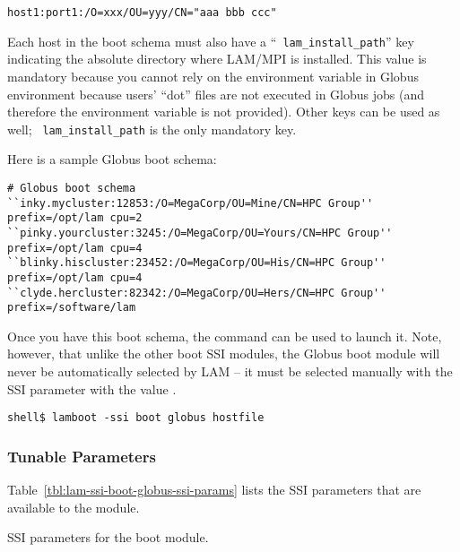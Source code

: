 \centerline{\tt host1:port1:/O=xxx/OU=yyy/CN="aaa bbb ccc"}
  
Each host in the boot schema must also have a ``{\tt
  lam\_\-install\_\-path}'' key indicating the absolute directory
where LAM/MPI is installed.  This value is mandatory because you
cannot rely on the  environment variable in Globus
environment because users' ``dot'' files are not executed in Globus
jobs (and therefore the  environment variable is not
provided).  Other keys can be used as well; {\tt
  lam\_\-install\_\-path} is the only mandatory key.

Here is a sample Globus boot schema:

\lstset{style=lam-shell}
\begin{lstlisting}
# Globus boot schema
``inky.mycluster:12853:/O=MegaCorp/OU=Mine/CN=HPC Group'' prefix=/opt/lam cpu=2
``pinky.yourcluster:3245:/O=MegaCorp/OU=Yours/CN=HPC Group'' prefix=/opt/lam cpu=4
``blinky.hiscluster:23452:/O=MegaCorp/OU=His/CN=HPC Group'' prefix=/opt/lam cpu=4
``clyde.hercluster:82342:/O=MegaCorp/OU=Hers/CN=HPC Group'' prefix=/software/lam
\end{lstlisting}

Once you have this boot schema, the  command can be used
to launch it.  Note, however, that unlike the other boot SSI modules,
the Globus boot module will never be automatically selected by LAM --
it must be selected manually with the  SSI parameter
with the value .

\lstset{style=lam-cmdline}
\begin{lstlisting}
shell$ lamboot -ssi boot globus hostfile
\end{lstlisting}


\subsubsection{Tunable Parameters}

Table~\ref{tbl:lam-ssi-boot-globus-ssi-params} lists the SSI
parameters that are available to the  module.

\begin{table}[htbp]
  \begin{ssiparamtb}
%
  \end{ssiparamtb}
  \caption{SSI parameters for the  boot module.}
  \label{tbl:lam-ssi-boot-globus-ssi-params}
\end{table}

